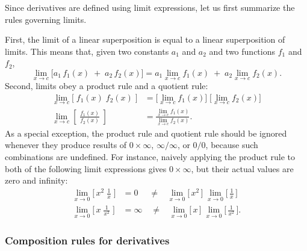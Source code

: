 \documentclass[10pt,a4paper]{article}
\begin{document}
Since derivatives are defined using limit expressions, let us first
summarize the rules governing limits.

First, the limit of a linear superposition is equal to a linear
superposition of limits. This means that, given two constants $a_1$
and $a_2$ and two functions $f_1$ and $f_2$,
\begin{equation}
\lim_{x \rightarrow c} \big[a_1 \,f_1(x) \;+\; a_2\, f_2(x)\big] = a_1 \lim_{x \rightarrow c} f_1(x) \;+\; a_2 \lim_{x \rightarrow c} f_2(x).
\end{equation}
Second, limits obey a product rule and a quotient rule:
\begin{equation}
\begin{aligned}\lim_{x \rightarrow c} \big[\;f_1(x) \; f_2(x)\;\big] &= \Big[\lim_{x \rightarrow c} f_1(x)\Big]\;\Big[\lim_{x \rightarrow c} f_2(x)\Big]  \\ \lim_{x \rightarrow c} \left[\;\frac{f_1(x)}{f_2(x)}\;\right] &= \frac{\lim_{x \rightarrow c} f_1(x)}{\lim_{x \rightarrow c} f_2(x)}. \end{aligned}
\end{equation}
As a special exception, the product rule and quotient rule should be
ignored whenever they produce results of $0 \times \infty$,
$\infty/\infty$, or $0/0$, because such combinations are undefined.
For instance, naively applying the product rule to both of the following
limit expressions gives $0 \times \infty$, but their actual values are
zero and infinity:
\begin{equation}
\begin{aligned}\lim_{x \rightarrow 0}\Big[\,x^2\;\frac{1}{x}\;\Big] &= 0  \;\quad \ne\;\;\;\lim_{x \rightarrow 0}\Big[\,x^2\,\Big]\; \lim_{x \rightarrow 0}\Big[\,\frac{1}{x}\,\Big]\\ \lim_{x \rightarrow 0}\Big[\,x\;\frac{1}{x^2}\;\Big] &= \infty \quad \ne\;\;\;\lim_{x \rightarrow 0}\Big[\,x\,\Big]\; \lim_{x \rightarrow 0}\Big[\,\frac{1}{x^2}\,\Big].\end{aligned}
\end{equation}

\subsubsection{Composition rules for derivatives}
\label{composition-rules-for-derivatives}
\end{document}
